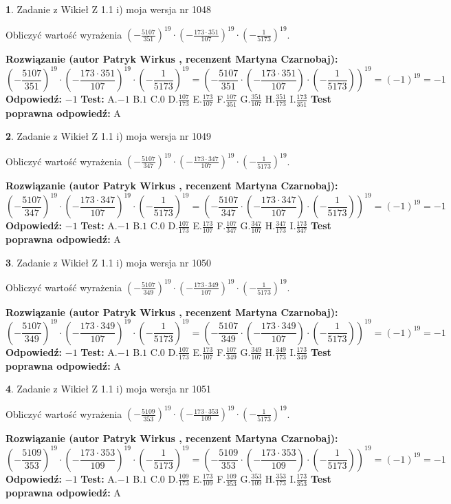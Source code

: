 \documentclass[12pt, a4paper]{article}
\theoremstyle{definition} %
\newtheorem{zad}{}
\newcommand{\zadStart}[1]{\begin{zad}#1\newline}
\newcommand{\zadStop}{\end{zad}}
\newcommand{\rozwStart}[2]{\noindent \textbf{Rozwiązanie (autor #1 , recenzent #2): }\newline}
\newcommand{\rozwStop}{\newline}
\newcommand{\odpStart}{\noindent \textbf{Odpowiedź:}\newline}
\newcommand{\odpStop}{\newline}
\newcommand{\testStart}{\noindent \textbf{Test:}\newline}
\newcommand{\testStop}{\newline}
\newcommand{\kluczStart}{\noindent \textbf{Test poprawna odpowiedź:}\newline}
\newcommand{\kluczStop}{\newline}
\begin{document}
\zadStart{Zadanie z Wikieł Z 1.1 i) moja wersja nr 1048}

Obliczyć wartość wyrażenia $(-\frac{5107}{351})^{19} \cdot (-\frac{173 \cdot 351}{107})^{19} \cdot (-\frac{1}{5173})^{19}$.
\zadStop
\rozwStart{Patryk Wirkus}{Martyna Czarnobaj}
$$(-\frac{5107}{351})^{19} \cdot (-\frac{173 \cdot 351}{107})^{19} \cdot (-\frac{1}{5173})^{19} = (-\frac{5107}{351} \cdot (-\frac{173 \cdot 351}{107}) \cdot (-\frac{1}{5173}))^{19} = (-1)^{19} = -1$$
\rozwStop
\odpStart
$-1$
\odpStop
\testStart
A.$-1$ B.$1$ C.$0$ D.$\frac{107}{173}$ E.$\frac{173}{107}$
F.$\frac{107}{351}$ G.$\frac{351}{107}$
H.$\frac{351}{173}$
I.$\frac{173}{351}$
\testStop
\kluczStart
A
\kluczStop



\zadStart{Zadanie z Wikieł Z 1.1 i) moja wersja nr 1049}

Obliczyć wartość wyrażenia $(-\frac{5107}{347})^{19} \cdot (-\frac{173 \cdot 347}{107})^{19} \cdot (-\frac{1}{5173})^{19}$.
\zadStop
\rozwStart{Patryk Wirkus}{Martyna Czarnobaj}
$$(-\frac{5107}{347})^{19} \cdot (-\frac{173 \cdot 347}{107})^{19} \cdot (-\frac{1}{5173})^{19} = (-\frac{5107}{347} \cdot (-\frac{173 \cdot 347}{107}) \cdot (-\frac{1}{5173}))^{19} = (-1)^{19} = -1$$
\rozwStop
\odpStart
$-1$
\odpStop
\testStart
A.$-1$ B.$1$ C.$0$ D.$\frac{107}{173}$ E.$\frac{173}{107}$
F.$\frac{107}{347}$ G.$\frac{347}{107}$
H.$\frac{347}{173}$
I.$\frac{173}{347}$
\testStop
\kluczStart
A
\kluczStop



\zadStart{Zadanie z Wikieł Z 1.1 i) moja wersja nr 1050}

Obliczyć wartość wyrażenia $(-\frac{5107}{349})^{19} \cdot (-\frac{173 \cdot 349}{107})^{19} \cdot (-\frac{1}{5173})^{19}$.
\zadStop
\rozwStart{Patryk Wirkus}{Martyna Czarnobaj}
$$(-\frac{5107}{349})^{19} \cdot (-\frac{173 \cdot 349}{107})^{19} \cdot (-\frac{1}{5173})^{19} = (-\frac{5107}{349} \cdot (-\frac{173 \cdot 349}{107}) \cdot (-\frac{1}{5173}))^{19} = (-1)^{19} = -1$$
\rozwStop
\odpStart
$-1$
\odpStop
\testStart
A.$-1$ B.$1$ C.$0$ D.$\frac{107}{173}$ E.$\frac{173}{107}$
F.$\frac{107}{349}$ G.$\frac{349}{107}$
H.$\frac{349}{173}$
I.$\frac{173}{349}$
\testStop
\kluczStart
A
\kluczStop



\zadStart{Zadanie z Wikieł Z 1.1 i) moja wersja nr 1051}

Obliczyć wartość wyrażenia $(-\frac{5109}{353})^{19} \cdot (-\frac{173 \cdot 353}{109})^{19} \cdot (-\frac{1}{5173})^{19}$.
\zadStop
\rozwStart{Patryk Wirkus}{Martyna Czarnobaj}
$$(-\frac{5109}{353})^{19} \cdot (-\frac{173 \cdot 353}{109})^{19} \cdot (-\frac{1}{5173})^{19} = (-\frac{5109}{353} \cdot (-\frac{173 \cdot 353}{109}) \cdot (-\frac{1}{5173}))^{19} = (-1)^{19} = -1$$
\rozwStop
\odpStart
$-1$
\odpStop
\testStart
A.$-1$ B.$1$ C.$0$ D.$\frac{109}{173}$ E.$\frac{173}{109}$
F.$\frac{109}{353}$ G.$\frac{353}{109}$
H.$\frac{353}{173}$
I.$\frac{173}{353}$
\testStop
\kluczStart
A
\kluczStop
\end{document}
